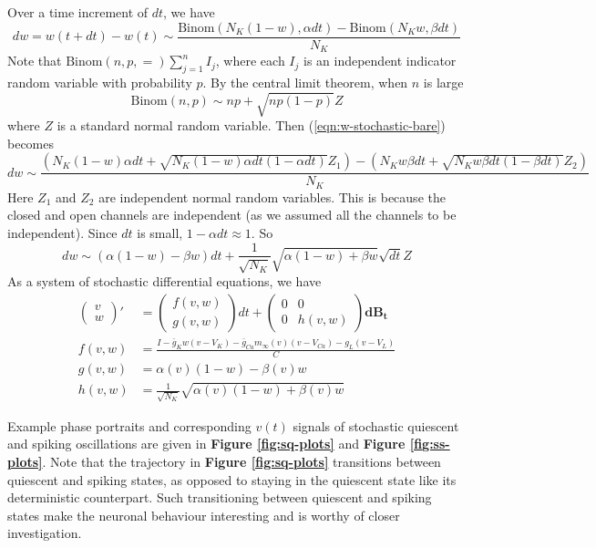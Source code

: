 \documentclass[letterpaper,12pt]{article}
\numberwithin{table}{section}
\numberwithin{figure}{section}
\numberwithin{equation}{section}
\newcommand*{\Binom}[2]{\text{Binom}\left(#1, #2\right)}
\newcommand*{\qvec}[2]{\begin{pmatrix} #1 \\ #2 \end{pmatrix}}
\newcommand*{\qmat}[4]{\begin{pmatrix} #1 & #2 \\ #3 & #4 \end{pmatrix}}
\newcommand{\reffig}[1]{\textbf{Figure \ref{#1}}}
\begin{document}
\begin{flushleft}
    Over a time increment of $dt$, we have
    \begin{equation}
        \label{eqn:w-stochastic-bare}
        dw = w(t + dt) - w(t) \sim \frac{\Binom{N_K (1 - w)}{\alpha dt} - \Binom{N_K w}{\beta dt}}{N_K}
    \end{equation}
    Note that $\Binom{n, p} = \sum_{j = 1}^n I_j$, where each $I_j$ is an independent indicator random variable with probability $p$. By the central limit theorem, when $n$ is large
    \begin{equation}
        \Binom{n}{p} \sim np + \sqrt{np(1-p)} Z
    \end{equation}
    where $Z$ is a standard normal random variable. Then (\ref{eqn:w-stochastic-bare}) becomes
    \small
    \begin{equation}
        dw \sim \frac{\left(N_K (1 - w) \alpha dt + \sqrt{N_K(1 - w) \alpha dt (1 - \alpha dt)}Z_1\right) - \left(N_K w \beta dt + \sqrt{N_K w \beta dt (1 - \beta dt)}Z_2\right)}{N_K}
    \end{equation}
    \normalsize
    Here $Z_1$ and $Z_2$ are independent normal random variables. This is because the closed and open channels are independent (as we assumed all the channels to be independent). Since $dt$ is small, $1 - \alpha dt \approx 1$. So
    \begin{equation}
        dw \sim \left(\alpha (1 - w) - \beta w\right) dt + \frac{1}{\sqrt{N_K}}\sqrt{\alpha (1 - w) + \beta w}\sqrt{dt}Z
    \end{equation}
    As a system of stochastic differential equations, we have
    \begin{align}
        \label{eqn:ml-stochastic}
        \qvec{v}{w}' &= \qvec{f(v, w)}{g(v, w)} dt + \qmat{0}{0}{0}{h(v, w)} \mathbf{dB_t} \\
        f(v, w) &= \frac{I - \bar{g}_K w (v - V_K) - \bar{g}_{Ca} m_\infty(v) (v - V_{Ca}) - g_L (v - V_L)}{C} \\
        g(v, w) &= \alpha(v) (1 - w) - \beta(v) w \\
        \label{eqn:ml-stochastic-end}
        h(v, w) &= \frac{1}{\sqrt{N_K}}\sqrt{\alpha(v) (1 - w) + \beta(v) w}
    \end{align}

    Example phase portraits and corresponding $v(t)$ signals of stochastic quiescent and spiking oscillations are given in \reffig{fig:sq-plots} and \reffig{fig:ss-plots}. Note that the trajectory in \reffig{fig:sq-plots} transitions between quiescent and spiking states, as opposed to staying in the quiescent state like its deterministic counterpart. Such transitioning between quiescent and spiking states make the neuronal behaviour interesting and is worthy of closer investigation.


\end{flushleft}
\end{document}
